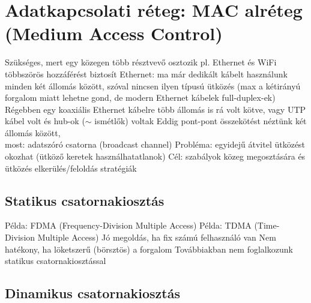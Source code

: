 \documentclass[12pt,a4paper]{article}
\begin{document}
\pagebreak

\section{Adatkapcsolati réteg: MAC alréteg (Medium Access Control)}

\begin{outline}
	\1 Szükséges, mert egy közegen több résztvevő osztozik
		\2 pl. Ethernet és WiFi többszörös hozzáférést biztosít
		\2 Ethernet: ma már dedikált kábelt használunk minden két állomás között, szóval nincsen ilyen típusú ütközés (max a kétirányú forgalom miatt lehetne gond, de modern Ethernet kábelek full-duplex-ek)
			\3 Régebben egy koaxiális Ethernet kábelre több állomás is rá volt kötve, vagy UTP kábel volt és hub-ok ($\sim$ ismétlők) voltak
	\1 Eddig pont-pont összekötést néztünk két állomás között,\\
	most: adatszóró csatorna (broadcast channel)
	\1 Probléma: egyidejű átvitel ütközést okozhat (ütköző keretek használhatatlanok)
	\1 Cél: szabályok közeg megosztására és ütközés elkerülés/feloldás stratégiák
\end{outline}

\subsection{Statikus csatornakiosztás}

\begin{outline}
	\1 Példa: FDMA (Frequency-Division Multiple Access)
	\1 Példa: TDMA (Time-Division Multiple Access)
	\1 Jó megoldás, ha fix számú felhasználó van
	\1 Nem hatékony, ha löketszerű (börsztös) a forgalom
	\1 Továbbiakban nem foglalkozunk statikus csatornakiosztással
\end{outline}

\pagebreak

\subsection{Dinamikus csatornakiosztás}
\end{document}
